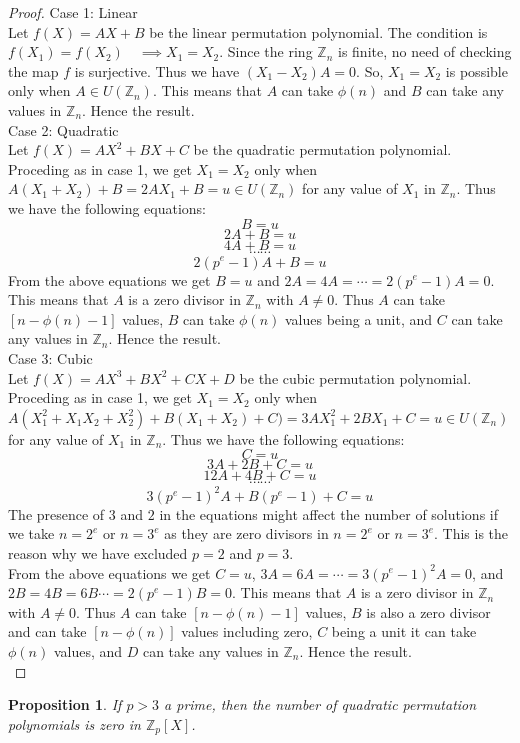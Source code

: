 \documentclass[sn-mathphys,Numbered]{sn-jnl}%
\theoremstyle{thmstyleone}
\newtheorem{proposition}[theorem]{Proposition}
\theoremstyle{thmstyletwo}
\theoremstyle{thmstylethree}
\begin{document}
\begin{proof}
Case 1: Linear \\
Let $f(X)=AX+B$ be the linear permutation polynomial. The condition is $f(X_{1})=f(X_{2}) \quad \implies X_{1}=X_{2}$. Since the ring $\mathbb{Z}_{n}$ is finite, no need of checking the map $f$ is surjective. Thus we have $(X_{1}-X_{2})A=0$. So, $X_{1}=X_{2}$ is possible only when $A \in U(\mathbb{Z}_{n})$. This means that $A$ can take $\phi(n)$ and $B$ can take any values in $\mathbb{Z}_{n}$. Hence the result. \\
Case 2: Quadratic \\
Let $f(X)=AX^{2}+BX+C$ be the quadratic permutation polynomial. Proceding as in case 1, we get $X_{1}=X_{2}$ only when $A(X_{1}+X_{2})+B=2AX_{1}+B=u  \in U(\mathbb{Z}_{n})$ for any value of $X_{1}$ in 
$\mathbb{Z}_{n}$. Thus we have the following equations:
$$B=u$$
$$2A+B=u$$
$$4A+B=u$$
$$\cdots \cdots $$
$$2(p^{e}-1)A+B=u$$
From the above equations we get $B=u$ and $2A=4A=\cdots =2(p^{e}-1)A=0$. This means that $A$ is a zero divisor in $\mathbb{Z}_{n}$ with $A \neq 0$. Thus $A$ can take $[n-\phi(n)-1]$ values, $B$ can take $\phi(n)$ values being a unit, and $C$ can take any values in  $\mathbb{Z}_{n}$. Hence the result. \\
Case 3: Cubic \\
Let $f(X)=AX^{3}+BX^{2}+CX+D$ be the cubic permutation polynomial. Proceding as in case 1, we get $X_{1}=X_{2}$ only when $A(X_{1}^{2}+X_{1}X_{2}+X_{2}^{2})+B(X_{1}+X_{2})+C)=3AX_{1}^{2}+2BX_{1}+C=u  \in U(\mathbb{Z}_{n})$ for any value of $X_{1}$ in 
$\mathbb{Z}_{n}$. Thus we have the following equations:
$$C=u$$
$$3A+2B+C=u$$
$$12A+4B+C=u$$
$$\cdots \cdots $$
$$3(p^{e}-1)^{2}A+B(p^{e}-1)+C=u$$
The presence of $3$ and $2$ in the equations might affect the number of solutions if we take $n=2^{e}$ or $n=3^{e}$ as they are zero divisors in $n=2^{e}$ or $n=3^{e}$. This is the reason why we have excluded $p=2$ and $p=3$. \\
From the above equations we get $C=u$,  $3A=6A=\cdots =3(p^{e}-1)^{2}A=0$, and $2B=4B=6B \cdots = 2(p^{e}-1)B=0$. This means that $A$ is a zero divisor in $\mathbb{Z}_{n}$ with $A \neq 0$. Thus $A$ can take $[n-\phi(n)-1]$ values, $B$ is also a zero divisor and can take $[n-\phi(n)]$ values including zero,  $C$ being a unit it can take $\phi(n)$ values, and $D$ can take any values in  $\mathbb{Z}_{n}$. Hence the result. \\
\end{proof}
\begin{proposition}
If $p>3$ a prime, then the number of quadratic permutation polynomials is zero in $\mathbb{Z}_{p}[X]$. 
\end{proposition}
\end{document}
